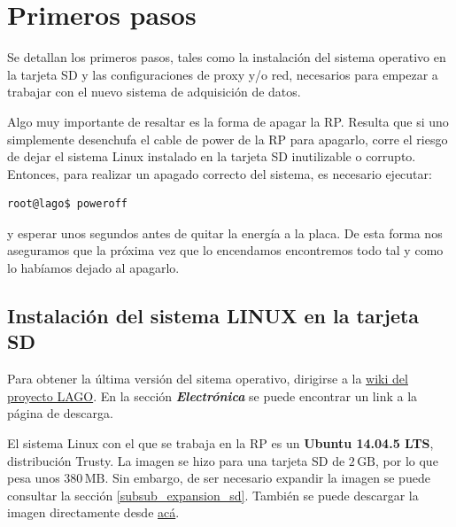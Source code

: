 \documentclass[a4paper,11pt]{article}
\begin{document}
%

\section{Primeros pasos}

Se detallan los primeros pasos, tales como la instalación del sistema operativo
en la tarjeta SD y las configuraciones de proxy y/o red, necesarios para
empezar a trabajar con el nuevo sistema de adquisición de datos.

\noindent Algo muy importante de resaltar es la forma de apagar la RP. Resulta que si uno
simplemente desenchufa el cable de power de la RP para apagarlo, corre el
riesgo de dejar el sistema Linux instalado en la tarjeta SD inutilizable o
corrupto. Entonces, para realizar un apagado correcto del sistema, es necesario
ejecutar:

\begin{verbatim}
root@lago$ poweroff
\end{verbatim}

\noindent y esperar unos segundos antes de quitar la energía a la placa. De esta
forma nos aseguramos que la próxima vez que lo encendamos encontremos todo tal
y como lo habíamos dejado al apagarlo.

\subsection{Instalación del sistema LINUX en la tarjeta SD}

Para obtener la última versión del sitema operativo, dirigirse a la
\href{http://wiki.lagoproject.org/index.php?title=Main\_Page}{wiki del proyecto
LAGO}. En la sección \textit{\textbf{Electrónica}} se puede encontrar un link a
la página de descarga. 

El sistema Linux con el que se trabaja en la RP es un \textbf{Ubuntu 14.04.5
LTS},
distribución Trusty. La imagen se hizo para una tarjeta SD de $2\,\text{GB}$, por lo que
pesa unos $380\,\text{MB}$. Sin embargo, de ser necesario expandir la imagen se puede
consultar la sección \ref{subsub_expansion_sd}.
También se puede descargar la imagen directamente desde
\href{https://mega.nz/#!BxZgmLjY!I8BuaMg53Kzo\_eZQKRjOMfJlu95qR2zWT\_BbRXjgNVQ}{acá}.   
\end{document}
